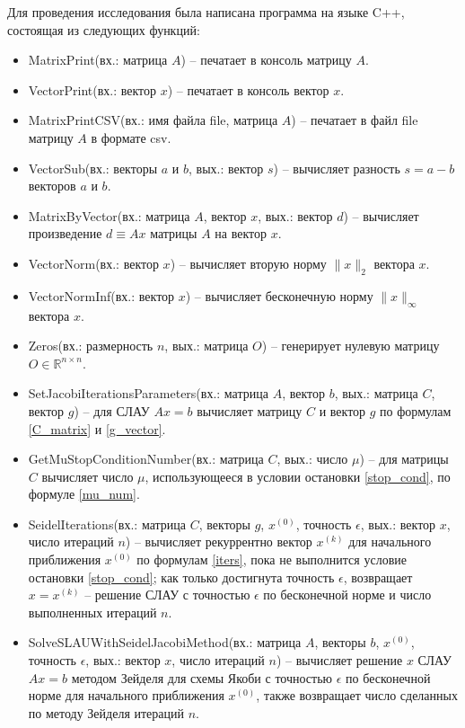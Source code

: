 \documentclass[a4paper, 12pt]{article}
\theoremstyle{definition}
\begin{document}
	Для проведения исследования была написана программа на языке C++, состоящая из следующих функций:
	\begin{itemize}
		\item MatrixPrint(вх.: матрица $A$) -- печатает в консоль матрицу $A$.
		\item VectorPrint(вх.: вектор $x$) -- печатает в консоль вектор $x$.
		\item MatrixPrintCSV(вх.: имя файла file, матрица $A$) -- печатает в файл file матрицу $A$ в формате csv.
		\item VectorSub(вх.: векторы $a$ и $b$, вых.: вектор $s$) -- вычисляет разность $s=a-b$ векторов $a$ и $b$.
		\item MatrixByVector(вх.: матрица $A$, вектор $x$, вых.: вектор $d$) -- вычисляет произведение $d\equiv Ax$ матрицы $A$ на вектор $x$.
		\item VectorNorm(вх.: вектор $x$) -- вычисляет вторую норму $\|x\|_2$ вектора $x$.
		\item VectorNormInf(вх.: вектор $x$) -- вычисляет бесконечную норму $\|x\|_{\infty}$ вектора $x$.
		\item Zeros(вх.: размерность $n$, вых.: матрица $O$) -- генерирует нулевую матрицу $O\in\mathbb{R}^{n\times n}$.
		\item SetJacobiIterationsParameters(вх.: матрица $A$, вектор $b$, вых.: матрица $C$, вектор $g$) -- для СЛАУ $Ax=b$ вычисляет матрицу $C$ и вектор $g$ по формулам \eqref{C_matrix} и \eqref{g_vector}.
		\item GetMuStopConditionNumber(вх.: матрица $C$, вых.: число $\mu$) -- для матрицы $C$ вычисляет число $\mu$, использующееся в условии остановки \eqref{stop_cond}, по формуле \eqref{mu_num}.
		\item SeidelIterations(вх.: матрица $C$, векторы $g$, $x^{(0)}$, точность $\epsilon$, вых.: вектор $x$, число итераций $n$) -- вычисляет рекуррентно вектор $x^{(k)}$ для начального приближения $x^{(0)}$ по формулам \eqref{iters}, пока не выполнится условие остановки \eqref{stop_cond}; как только достигнута точность $\epsilon$, возвращает $x=x^{(k)}$ -- решение СЛАУ с точностью $\epsilon$ по бесконечной норме и число выполненных итераций $n$.
		\item SolveSLAUWithSeidelJacobiMethod(вх.: матрица $A$, векторы $b$, $x^{(0)}$, точность $\epsilon$, вых.: вектор $x$, число итераций $n$) -- вычисляет решение $x$ СЛАУ $Ax=b$ методом Зейделя для схемы Якоби с точностью $\epsilon$ по бесконечной норме для начального приближения $x^{(0)}$, также возвращает число сделанных по методу Зейделя итераций $n$.

\end{itemize}
\end{document}

